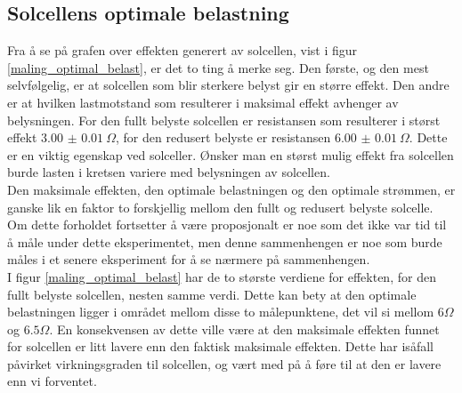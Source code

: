 \documentclass[%
 reprint,
 amsmath,amssymb,
 aps,
 norsk,
 booktabs
]{revtex4-1}
\begin{document}
\subsection{Solcellens optimale belastning}
Fra å se på grafen over effekten generert av solcellen, vist i figur \vref{maling_optimal_belast}, er det to ting å merke seg. Den første, og den mest selvfølgelig, er at solcellen som blir sterkere belyst gir en større effekt. Den andre er at hvilken lastmotstand som resulterer i maksimal effekt avhenger av belysningen. For den fullt belyste solcellen er resistansen som resulterer i størst effekt $\SI{3.00(1)}{\Omega}$, for den redusert belyste er resistansen $\SI{6.00(1)}{\Omega}$. Dette er en viktig egenskap ved solceller. Ønsker man en størst mulig effekt fra solcellen burde lasten i kretsen variere med belysningen av solcellen.
\\Den maksimale effekten, den optimale belastningen og den optimale strømmen, er ganske lik en faktor to forskjellig mellom den fullt og redusert belyste solcelle. Om dette forholdet fortsetter å være proposjonalt er noe som det ikke var tid til å måle under dette eksperimentet, men denne sammenhengen er noe som burde måles i et senere eksperiment for å se nærmere på sammenhengen.\\
I figur \vref{maling_optimal_belast} har de to største verdiene for effekten, for den fullt belyste solcellen, nesten samme verdi. Dette kan bety at den optimale belastningen ligger i området mellom disse to målepunktene, det vil si mellom $6\Omega$ og $6.5\Omega$. En konsekvensen av dette ville være at den maksimale effekten funnet for solcellen er litt lavere enn den faktisk maksimale effekten. Dette har isåfall påvirket virkningsgraden til solcellen, og vært med på å føre til at den er lavere enn vi forventet.
\end{document}
